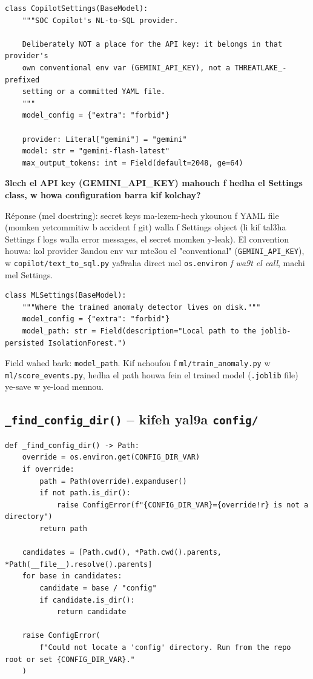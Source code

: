\documentclass[11pt,a4paper]{report}
\DeclareRobustCommand{\code}[1]{\texttt{#1}}
\DeclareRobustCommand{\file}[1]{\texttt{\color{amber}#1}}
\begin{document}
\begin{lstlisting}[style=pystyle]
class CopilotSettings(BaseModel):
    """SOC Copilot's NL-to-SQL provider.

    Deliberately NOT a place for the API key: it belongs in that provider's
    own conventional env var (GEMINI_API_KEY), not a THREATLAKE_-prefixed
    setting or a committed YAML file.
    """
    model_config = {"extra": "forbid"}

    provider: Literal["gemini"] = "gemini"
    model: str = "gemini-flash-latest"
    max_output_tokens: int = Field(default=2048, ge=64)
\end{lstlisting}

\begin{soual}
\textbf{3lech el API key (GEMINI\_API\_KEY) mahouch f hedha el Settings class,
w howa configuration barra kif kolchay?}

Réponse (mel docstring): secret keys ma-lezem-hech ykounou f YAML file
(momken yetcommitiw b accident f git) walla f Settings object (li kif tal3ha
Settings f logs walla error messages, el secret momken y-leak). El convention
houwa: kol provider 3andou env var mte3ou el "conventional" (\code{GEMINI\_API\_KEY}),
w \code{copilot/text\_to\_sql.py} ya9raha direct mel \code{os.environ} \emph{f
wa9t el call}, machi mel Settings.
\end{soual}

\begin{lstlisting}[style=pystyle]
class MLSettings(BaseModel):
    """Where the trained anomaly detector lives on disk."""
    model_config = {"extra": "forbid"}
    model_path: str = Field(description="Local path to the joblib-persisted IsolationForest.")
\end{lstlisting}

Field wahed bark: \code{model\_path}. Kif nchoufou f \file{ml/train\_anomaly.py}
w \file{ml/score\_events.py}, hedha el path houwa fein el trained model
(\code{.joblib} file) ye-save w ye-load mennou.

\subsection{\code{\_find\_config\_dir()} -- kifeh yal9a \code{config/}}

\begin{lstlisting}[style=pystyle]
def _find_config_dir() -> Path:
    override = os.environ.get(CONFIG_DIR_VAR)
    if override:
        path = Path(override).expanduser()
        if not path.is_dir():
            raise ConfigError(f"{CONFIG_DIR_VAR}={override!r} is not a directory")
        return path

    candidates = [Path.cwd(), *Path.cwd().parents, *Path(__file__).resolve().parents]
    for base in candidates:
        candidate = base / "config"
        if candidate.is_dir():
            return candidate

    raise ConfigError(
        f"Could not locate a 'config' directory. Run from the repo root or set {CONFIG_DIR_VAR}."
    )
\end{lstlisting}
\end{document}
